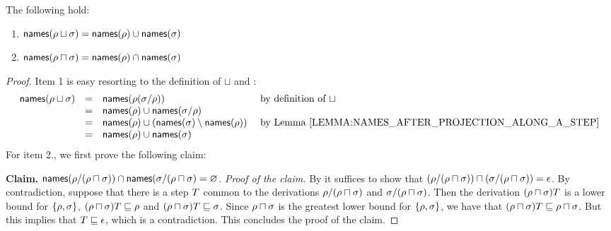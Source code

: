 \begin{proposition}
The following hold:
\begin{enumerate}
\item $\mathsf{names}(\rho \sqcup \sigma) = \mathsf{names}(\rho) \cup \mathsf{names}(\sigma)$
\item $\mathsf{names}(\rho \sqcap \sigma) = \mathsf{names}(\rho) \cap \mathsf{names}(\sigma)$
\end{enumerate}
\end{proposition}
\begin{proof}
Item 1 is easy resorting to the definition of $\sqcup$
and :
\[
  \begin{array}{rcll}
  \names(\redseq \sqcup \redseqtwo) & = & \names(\redseq(\redseqtwo/\redseq)) & \text{ by definition of $\sqcup$} \\
                                    & = & \names(\redseq) \cup \names(\redseqtwo/\redseq) \\
                                    & = & \names(\redseq) \cup (\names(\redseqtwo) \setminus \names(\redseq)) & \text{ by \rlem{names_after_projection_along_a_step}} \\
                                    & = & \names(\redseq) \cup \names(\redseqtwo) \\
  \end{array}
\]
For item 2., we first prove the following claim:\medskip

{\bf Claim.} $\mathsf{names}(\rho/(\rho \sqcap \sigma)) \cap \mathsf{names}(\sigma/(\rho \sqcap \sigma) = \varnothing$.
{\em Proof of the claim.}
By  it suffices to show that
$(\rho/(\rho \sqcap \sigma)) \sqcap (\sigma/(\rho \sqcap \sigma)) = \epsilon$.
By contradiction, suppose that there is a step $T$ common to
the derivations
$\rho/(\rho \sqcap \sigma)$ and $\sigma/(\rho \sqcap \sigma)$.
Then the derivation $(\rho \sqcap \sigma)T$ is a lower bound for $\{\rho,\sigma\}$,
\ie
$(\rho \sqcap \sigma)T \sqsubseteq \rho$
and
$(\rho \sqcap \sigma)T \sqsubseteq \sigma$.
Since $\rho \sqcap \sigma$ is the greatest lower bound for $\{\rho,\sigma\}$,
we have that $(\rho \sqcap \sigma)T \sqsubseteq \rho \sqcap \sigma$.
But this implies that $T \sqsubseteq \epsilon$, which is a contradiction.
This concludes the proof of the claim.
\medskip


\end{proof}
